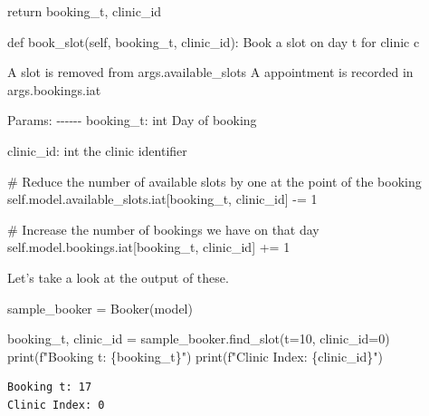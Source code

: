 \documentclass[
  letterpaper,
  DIV=11,
  numbers=noendperiod]{scrreprt}
\newenvironment{Shaded}{\begin{snugshade}}{\end{snugshade}}
\newcommand{\BuiltInTok}[1]{\textcolor[rgb]{0.00,0.23,0.31}{#1}}
\newcommand{\CommentTok}[1]{\textcolor[rgb]{0.37,0.37,0.37}{#1}}
\newcommand{\ControlFlowTok}[1]{\textcolor[rgb]{0.00,0.23,0.31}{#1}}
\newcommand{\DecValTok}[1]{\textcolor[rgb]{0.68,0.00,0.00}{#1}}
\newcommand{\KeywordTok}[1]{\textcolor[rgb]{0.00,0.23,0.31}{#1}}
\newcommand{\NormalTok}[1]{\textcolor[rgb]{0.00,0.23,0.31}{#1}}
\newcommand{\OperatorTok}[1]{\textcolor[rgb]{0.37,0.37,0.37}{#1}}
\newcommand{\SpecialCharTok}[1]{\textcolor[rgb]{0.37,0.37,0.37}{#1}}
\newcommand{\SpecialStringTok}[1]{\textcolor[rgb]{0.13,0.47,0.30}{#1}}
\newcommand{\VariableTok}[1]{\textcolor[rgb]{0.07,0.07,0.07}{#1}}
\begin{document}
\begin{Shaded}
\begin{Highlighting}[]
        \ControlFlowTok{return}\NormalTok{ booking\_t, clinic\_id}


    \KeywordTok{def}\NormalTok{ book\_slot(}\VariableTok{self}\NormalTok{, booking\_t, clinic\_id):}
        \CommentTok{\textquotesingle{}\textquotesingle{}\textquotesingle{}}
\CommentTok{        Book a slot on day t for clinic c}

\CommentTok{        A slot is removed from args.available\_slots}
\CommentTok{        A appointment is recorded in args.bookings.iat}

\CommentTok{        Params:}
\CommentTok{        {-}{-}{-}{-}{-}{-}}
\CommentTok{        booking\_t: int}
\CommentTok{            Day of booking}

\CommentTok{        clinic\_id: int}
\CommentTok{            the clinic identifier}
\CommentTok{        \textquotesingle{}\textquotesingle{}\textquotesingle{}}

        \CommentTok{\# Reduce the number of available slots by one at the point of the booking}
        \VariableTok{self}\NormalTok{.model.available\_slots.iat[booking\_t, clinic\_id] }\OperatorTok{{-}=} \DecValTok{1}

        \CommentTok{\# Increase the number of bookings we have on that day}
        \VariableTok{self}\NormalTok{.model.bookings.iat[booking\_t, clinic\_id] }\OperatorTok{+=} \DecValTok{1}
\end{Highlighting}
\end{Shaded}

Let's take a look at the output of these.

\begin{Shaded}
\begin{Highlighting}[]
\NormalTok{sample\_booker }\OperatorTok{=}\NormalTok{ Booker(model)}

\NormalTok{booking\_t, clinic\_id }\OperatorTok{=}\NormalTok{ sample\_booker.find\_slot(t}\OperatorTok{=}\DecValTok{10}\NormalTok{, clinic\_id}\OperatorTok{=}\DecValTok{0}\NormalTok{)}
\BuiltInTok{print}\NormalTok{(}\SpecialStringTok{f"Booking t: }\SpecialCharTok{\{}\NormalTok{booking\_t}\SpecialCharTok{\}}\SpecialStringTok{"}\NormalTok{)}
\BuiltInTok{print}\NormalTok{(}\SpecialStringTok{f"Clinic Index: }\SpecialCharTok{\{}\NormalTok{clinic\_id}\SpecialCharTok{\}}\SpecialStringTok{"}\NormalTok{)}
\end{Highlighting}
\end{Shaded}

\begin{verbatim}
Booking t: 17
Clinic Index: 0
\end{verbatim}
\end{document}
